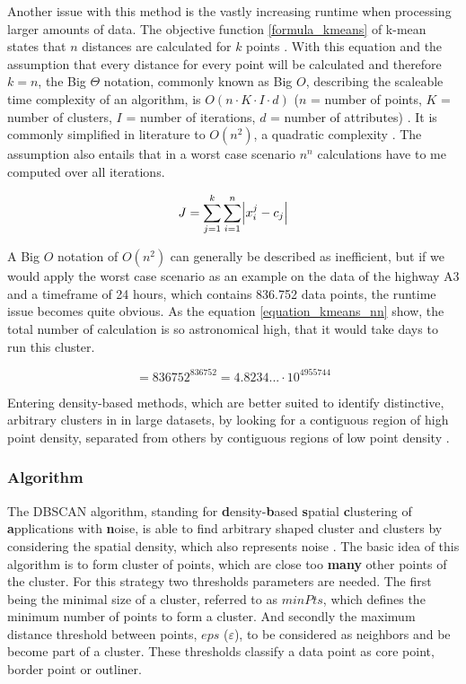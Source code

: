 \documentclass[a4paper,12pt]{report}
\begin{document}
Another issue with this method is the vastly increasing runtime when processing larger amounts of data. The objective function \ref{formula_kmeans} of k-mean states that $n$ distances are calculated for $k$ points \cite{Santhanam2010}. With this equation and the assumption that every distance for every point will be calculated and therefore $k=n$, the Big $\Theta$ notation, commonly known as Big $O$, describing the scaleable time complexity of an algorithm, is $O(n \cdot K \cdot I \cdot d)$ ($n$ = number of points, $K$ = number of clusters, $I$ = number of iterations, $d$ = number of attributes) \cite{Dalatu2016}. It is commonly simplified in literature to $O(n^2)$, a quadratic complexity \cite{Pakhira2014}. The assumption also entails that in a worst case scenario $n^n$ calculations have to me computed over all iterations.

\begin{equation}
\label{formula_kmeans}
	J =  \sum_{j=1}^k{\sum_{i=1}^n{\abs{x_i^j-c_j}}}
\end{equation}

\bigskip

A Big $O$ notation of $O(n^2)$ can generally be described as inefficient, but if we would apply the worst case scenario as an example on the data of the highway A3 and a timeframe of 24 hours, which contains 836.752 data points, the runtime issue becomes quite obvious. As the equation \ref{equation_kmeans_nn} show, the total number of calculation is so astronomical high, that it would take days to run this cluster. \cite{Busch2004}

\begin{equation}
\label{equation_kmeans_nn}
	 = 836752^{836752} = 4.8234... \cdot 10^{4955744}
\end{equation}

\bigskip

Entering density-based methods, which are better suited to identify distinctive, arbitrary clusters in in large datasets, by looking for a contiguous region of high point density, separated from others by contiguous regions of low point density \cite{Chauhan2020}. 

\subsubsection{Algorithm}

The DBSCAN algorithm, standing for \textbf{d}ensity-\textbf{b}ased \textbf{s}patial \textbf{c}lustering of \textbf{a}pplications with \textbf{n}oise, is able to find arbitrary shaped cluster and clusters by considering the spatial density, which also represents noise  \cite{Yildirim2020,Chauhan2020}. The basic idea of this algorithm is to form cluster of points, which are close too \textbf{many} other points of the cluster. For this strategy two thresholds parameters are needed. The first being the minimal size of a cluster, referred to as $minPts$, which defines the minimum number of points to form a cluster. And secondly the maximum distance threshold between points, $eps$ ($\varepsilon$), to be considered as neighbors and be become part of a cluster. These thresholds classify a data point as core point, border point or outliner. \cite{Yildirim2020,Chauhan2020}
\end{document}
